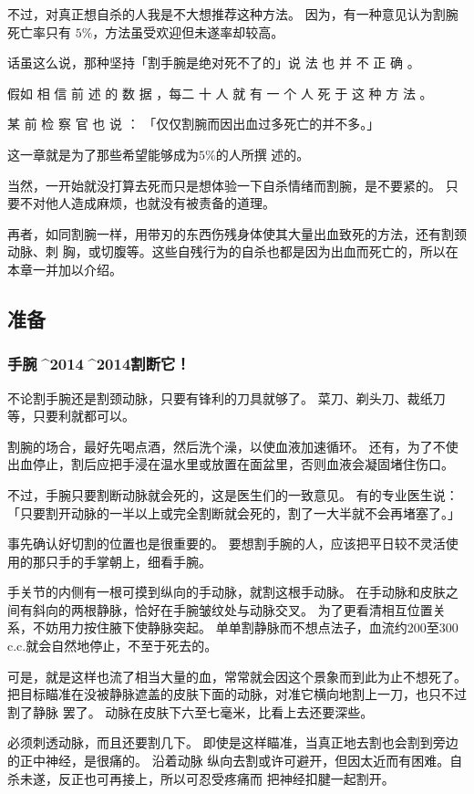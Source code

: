 \documentclass[UTF8]{ctexart}
\begin{document}
不过，对真正想自杀的人我是不大想推荐这种方法。
因为，有一种意见认为割腕死亡率只有 $5\%$，方法虽受欢迎但未遂率却较高。

话虽这么说，那种坚持「割手腕是绝对死不了的」说 法 也 并 不 正 确 。

假如 相 信 前 述 的 数 据 ，每二 十 人 就 有 一 个 人 死 于 这 种 方 法 。

某 前 检 察 官 也 说 ： 「仅仅割腕而因出血过多死亡的并不多。」

这一章就是为了那些希望能够成为$5\%$的人所撰 述的。

当然，一开始就没打算去死而只是想体验一下自杀情绪而割腕，是不要紧的。
只要不对他人造成麻烦，也就没有被责备的道理。

再者，如同割腕一样，用带刃的东西伤残身体使其大量出血致死的方法，还有割颈动脉、刺
胸，或切腹等。这些自残行为的自杀也都是因为出血而死亡的，所以在本章一并加以介绍。

\subsection{准备}

\subsubsection{手腕^^^^2014^^^^2014割断它！}

不论割手腕还是割颈动脉，只要有锋利的刀具就够了。
菜刀、剃头刀、裁纸刀等，只要利就都可以。

割腕的场合，最好先喝点酒，然后洗个澡，以使血液加速循环。
还有，为了不使出血停止，割后应把手浸在温水里或放置在面盆里，否则血液会凝固堵住伤口。

不过，手腕只要割断动脉就会死的，这是医生们的一致意见。
有的专业医生说：「只要割开动脉的一半以上或完全割断就会死的，割了一大半就不会再堵塞了。」

事先确认好切割的位置也是很重要的。
要想割手腕的人，应该把平日较不灵活使用的那只手的手掌朝上，细看手腕。

手关节的内侧有一根可摸到纵向的手动脉，就割这根手动脉。
在手动脉和皮肤之间有斜向的两根静脉，恰好在手腕皱纹处与动脉交叉。
为了更看清相互位置关系，不妨用力按住腋下使静脉突起。
单单割静脉而不想点法子，血流约$200$至$300$c.c.就会自然地停止，不至于死去的。

可是，就是这样也流了相当大量的血，常常就会因这个景象而到此为止不想死了。
把目标瞄准在没被静脉遮盖的皮肤下面的动脉，对准它横向地割上一刀，也只不过割了静脉 罢了。
动脉在皮肤下六至七毫米，比看上去还要深些。

必须刺透动脉，而且还要割几下。
即使是这样瞄准，当真正地去割也会割到旁边的正中神经，是很痛的。
沿着动脉 纵向去割或许可避开，但因太近而有困难。自杀未遂，反正也可再接上，所以可忍受疼痛而 把神经扣腱一起割开。
\end{document}
